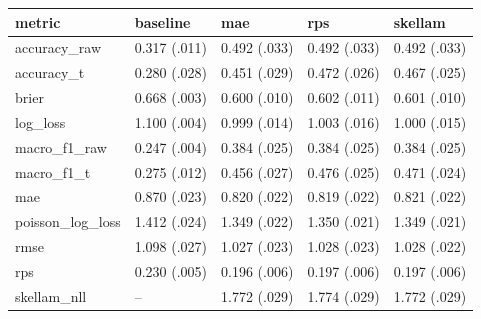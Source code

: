 
\begin{tabular}{lllll}
\toprule
metric & baseline & mae & rps & skellam\\
\midrule
accuracy\_raw & 0.317 (.011) & 0.492 (.033) & 0.492 (.033) & 0.492 (.033)\\
accuracy\_t & 0.280 (.028) & 0.451 (.029) & 0.472 (.026) & 0.467 (.025)\\
brier & 0.668 (.003) & 0.600 (.010) & 0.602 (.011) & 0.601 (.010)\\
log\_loss & 1.100 (.004) & 0.999 (.014) & 1.003 (.016) & 1.000 (.015)\\
macro\_f1\_raw & 0.247 (.004) & 0.384 (.025) & 0.384 (.025) & 0.384 (.025)\\
macro\_f1\_t & 0.275 (.012) & 0.456 (.027) & 0.476 (.025) & 0.471 (.024)\\
mae & 0.870 (.023) & 0.820 (.022) & 0.819 (.022) & 0.821 (.022)\\
poisson\_log\_loss & 1.412 (.024) & 1.349 (.022) & 1.350 (.021) & 1.349 (.021)\\
rmse & 1.098 (.027) & 1.027 (.023) & 1.028 (.023) & 1.028 (.022)\\
rps & 0.230 (.005) & 0.196 (.006) & 0.197 (.006) & 0.197 (.006)\\
skellam\_nll & -- & 1.772 (.029) & 1.774 (.029) & 1.772 (.029)\\
\bottomrule
\end{tabular}
